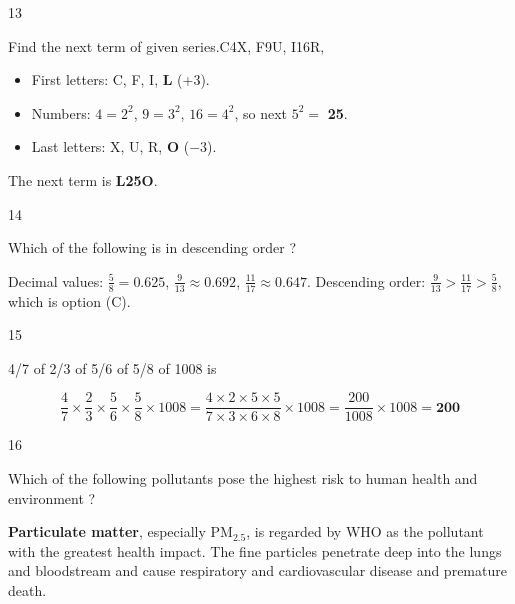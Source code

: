 \begin{question}{13}
{Find the next term of given series.\newline C4X, F9U, I16R, \blank{}\par}
\begin{explain}
\begin{itemize}
\item First letters: C, F, I, \textbf{L} (+3).
\item Numbers: $4=2^2$, $9=3^2$, $16=4^2$, so next $5^2=$ \textbf{25}.
\item Last letters: X, U, R, \textbf{O} ($-3$).
\end{itemize}
The next term is \textbf{L25O}.
\end{explain}
\end{question}

\begin{question}{14}
{Which of the following is in descending order ?\par}
\begin{explain}
Decimal values: $\tfrac58=0.625$, $\tfrac{9}{13}\approx0.692$, $\tfrac{11}{17}\approx0.647$.
Descending order: $\tfrac{9}{13}>\tfrac{11}{17}>\tfrac58$, which is option (C).
\end{explain}
\end{question}

\begin{question}{15}
{4/7 of 2/3 of 5/6 of 5/8 of 1008 is\par}
\begin{explain}
\[\frac47\times\frac23\times\frac56\times\frac58\times1008=\frac{4\times2\times5\times5}{7\times3\times6\times8}\times1008=\frac{200}{1008}\times1008=\mathbf{200}\]
\end{explain}
\end{question}

\begin{question}{16}
{Which of the following pollutants pose the highest risk to human health and environment ?\par}
\begin{explain}
\textbf{Particulate matter}, especially PM$_{2.5}$, is regarded by WHO as the pollutant with the greatest health impact. The fine particles penetrate deep into the lungs and bloodstream and cause respiratory and cardiovascular disease and premature death.
\end{explain}
\end{question}

